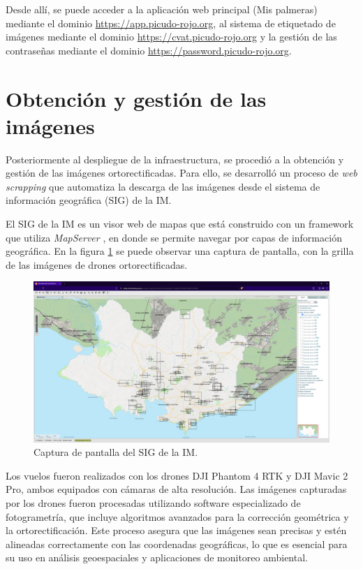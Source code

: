 Desde allí, se puede acceder a la aplicación web principal (Mis palmeras) mediante el dominio \url{https://app.picudo-rojo.org}, al sistema de etiquetado de imágenes mediante el dominio \url{https://cvat.picudo-rojo.org} y la gestión de las contraseñas mediante el dominio \url{https://password.picudo-rojo.org}.


\section{Obtención y gestión de las imágenes}
\label{sec:obtención-datos}

Posteriormente al despliegue de la infraestructura, se procedió a la obtención y gestión de las imágenes ortorectificadas. Para ello, se desarrolló un proceso de \textit{web scrapping} que automatiza la descarga de las imágenes desde el sistema de información geográfica (SIG) de la IM.

El SIG de la IM es un visor web de mapas que está construido con un framework que utiliza \textit{MapServer} \citep{mckenna_mapserver_2025}, en donde se permite navegar por capas de información geográfica. En la figura \ref{fig:sig-im} se puede observar una captura de pantalla, con la grilla de las imágenes de drones ortorectificadas.

\begin{figure}[H]
  \centering
  \includegraphics[scale=0.2]{./Figures/portada-sig.png}
  \caption{Captura de pantalla del SIG de la IM.}
  \label{fig:sig-im}
\end{figure}

Los vuelos fueron realizados con los drones DJI Phantom 4 RTK y DJI Mavic 2 Pro, ambos equipados con cámaras de alta resolución. Las imágenes capturadas por los drones fueron procesadas utilizando software especializado de fotogrametría, que incluye algoritmos avanzados para la corrección geométrica y la ortorectificación. Este proceso asegura que las imágenes sean precisas y estén alineadas correctamente con las coordenadas geográficas, lo que es esencial para su uso en análisis geoespaciales y aplicaciones de monitoreo ambiental.

